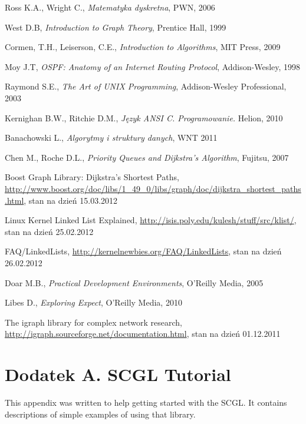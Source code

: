 \documentclass[a4paper,12pt,polish,twoside,openright]{thesis}
\begin{document}
\begin{thebibliography}{19}
Ross K.A., Wright C., \emph{Matematyka dyskretna}, PWN, 2006

West D.B, \emph{Introduction to Graph Theory}, Prentice Hall, 1999

Cormen, T.H., Leiserson, C.E., \emph{Introduction to Algorithms}, MIT Press, 2009

Moy J.T, \emph{OSPF: Anatomy of an Internet Routing Protocol}, Addison-Wesley, 1998

Raymond S.E., \emph{The Art of UNIX Programming}, Addison-Wesley Professional, 2003

Kernighan B.W., Ritchie D.M., \emph{Język ANSI C. Programowanie.} Helion, 2010

Banachowski L., \emph{Algorytmy i struktury danych}, WNT 2011

Chen M., Roche D.L., \emph{Priority Queues and Dijkstra's Algorithm}, Fujitsu, 2007

Boost Graph Library: Dijkstra's Shortest Paths, \url{http://www.boost.org/doc/libs/1_49_0/libs/graph/doc/dijkstra_shortest_paths.html}, stan na dzień 15.03.2012

Linux Kernel Linked List Explained, \url{http://isis.poly.edu/kulesh/stuff/src/klist/}, stan na dzień 25.02.2012

FAQ/LinkedLists, \url{http://kernelnewbies.org/FAQ/LinkedLists}, stan na dzień 26.02.2012

Doar M.B., \emph{Practical Development Environments}, O'Reilly Media, 2005

Libes D., \emph{Exploring Expect}, O'Reilly Media, 2010

The igraph library for complex network research, \url{http://igraph.sourceforge.net/documentation.html}, stan na dzień 01.12.2011

\end{thebibliography}

\chapter*{Dodatek A. SCGL Tutorial}
This appendix was written to help getting started with the SCGL.
It contains descriptions of simple examples of using that library.
\end{document}
